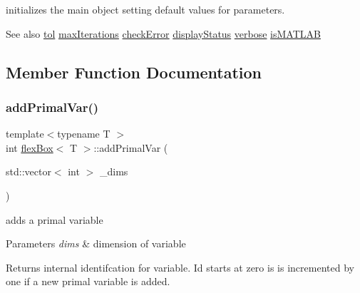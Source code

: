 initializes the main object setting default values for parameters. 

\begin{DoxySeeAlso}{See also}
\hyperlink{classflex_box_acd4f987e22eb761cff9f6c98592808b4}{tol} \hyperlink{classflex_box_aa20a8abc40427d7a4b8c709f1e38318d}{max\+Iterations} \hyperlink{classflex_box_a28507da8c03b9875319a2dd38e28cb4a}{check\+Error} \hyperlink{classflex_box_a0714316abd9498d53328da1f76f2a306}{display\+Status} \hyperlink{classflex_box_aec255fffc4f4356a781be89fee0ed08f}{verbose} \hyperlink{classflex_box_a8d280f8e287a339fc93ae7683b70456d}{is\+M\+A\+T\+L\+AB} 
\end{DoxySeeAlso}


\subsection{Member Function Documentation}
\mbox{\label{classflex_box_a659aac107b85ecf64c9fd1aaa465a98d}} 
\subsubsection{\texorpdfstring{add\+Primal\+Var()}{addPrimalVar()}}
{\footnotesize\ttfamily template$<$typename T $>$ \\
int \hyperlink{classflex_box}{flex\+Box}$<$ T $>$\+::add\+Primal\+Var (\begin{DoxyParamCaption}\item[{std\+::vector$<$ int $>$}]{\+\_\+dims }\end{DoxyParamCaption})\hspace{0.3cm}{\ttfamily [inline]}}



adds a primal variable 


\begin{DoxyParams}{Parameters}
{\em dims} & dimension of variable \\
\hline
\end{DoxyParams}
\begin{DoxyReturn}{Returns}
internal identifcation for variable. Id starts at zero is is incremented by one if a new primal variable is added. 
\end{DoxyReturn}
\mbox{\label{classflex_box_a4cba554c506d130824ace967bae82ac3}} 
